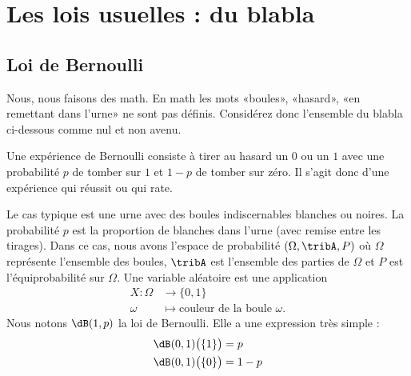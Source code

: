 
\section{Les lois usuelles : du blabla}

\subsection{Loi de Bernoulli}

\begin{normaltext}
	Nous, nous faisons des math. En math les mots «boules», «hasard», «en remettant dans l'urne» ne sont pas définis. Considérez donc l'ensemble du blabla ci-dessous comme nul et non avenu.
\end{normaltext}

Une expérience de Bernoulli consiste à tirer au hasard un \( 0\) ou un \( 1\) avec une probabilité \( p\) de tomber sur \( 1\) et \( 1-p\) de tomber sur zéro. Il s'agit donc d'une expérience qui réussit ou qui rate.

Le cas typique est une urne avec des boules indiscernables blanches ou noires. La probabilité \( p\) est la proportion de blanches dans l'urne (avec remise entre les tirages). Dans ce cas, nous avons l'espace de probabilité \( (\Omega,\tribA,P)\) où \( \Omega\) représente l'ensemble des boules, \( \tribA\) est l'ensemble des parties de \( \Omega\) et \( P\) est l'équiprobabilité sur \( \Omega\). Une variable aléatoire est une application
\begin{equation}
	\begin{aligned}
		X\colon \Omega & \to \{ 0,1 \}                               \\
		\omega         & \mapsto \text{couleur de la boule } \omega.
	\end{aligned}
\end{equation}
Nous notons \( \dB(1,p)\) la loi de Bernoulli. Elle a une expression très simple :
\begin{subequations}
	\begin{align}
		\dB(0,1)\big( \{ 1 \} \big) & =p   \\
		\dB(0,1)\big( \{ 0 \} \big) & =1-p
	\end{align}
\end{subequations}

